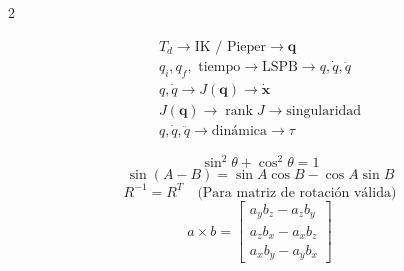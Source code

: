 \documentclass[10pt, a4paper]{article}
\begin{document}
\begin{multicols*}{2}
\begin{tcolorbox}[sectionbox, title=6. Mapa Conceptual de Unidad II{[cite: 10]}]
\begin{align*}
    \boxed{ T_d \rightarrow \text{IK / Pieper} \rightarrow \mathbf{q} } \\
    \boxed{ q_i,q_f,\text{ tiempo} \rightarrow \text{LSPB} \rightarrow q,\dot{q},\ddot{q} } \\
    \boxed{ q,\dot{q} \rightarrow J(\mathbf{q}) \rightarrow \dot{\mathbf{x}} } \\
    \boxed{ J(\mathbf{q}) \rightarrow \operatorname{rank}J \rightarrow \text{singularidad} } \\
    \boxed{ q,\dot{q},\ddot{q} \rightarrow \text{dinámica} \rightarrow \tau }
\end{align*}
\end{tcolorbox}

\begin{tcolorbox}[sectionbox, title=8. Identidades Útiles{[cite: 10]}]
\begin{equation*}
    \sin^2\theta+\cos^2\theta=1
\end{equation*}
\begin{equation*}
    \sin(A-B) = \sin A\cos B-\cos A\sin B
\end{equation*}
\begin{equation*}
    R^{-1}=R^T \quad \text{(Para matriz de rotación válida)}
\end{equation*}
\begin{equation*}
    a\times b = \begin{bmatrix} a_yb_z-a_zb_y\\ a_zb_x-a_xb_z\\ a_xb_y-a_yb_x \end{bmatrix}
\end{equation*}
\end{tcolorbox}


\end{multicols*}
\end{document}
